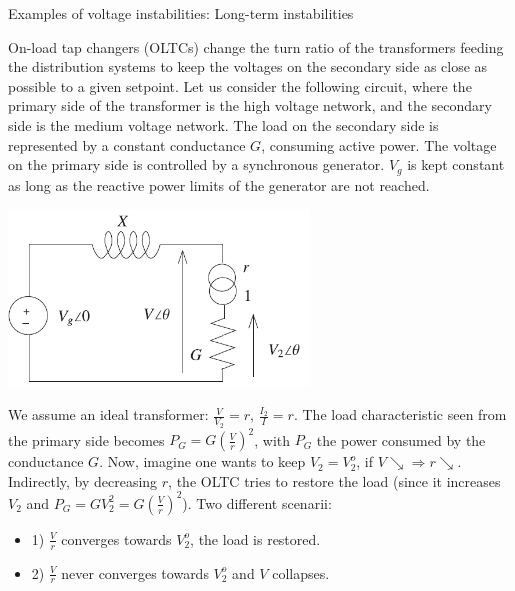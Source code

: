 \begin{frame}[allowframebreaks]{Examples of voltage instabilities: Long-term instabilities}

On-load tap changers (OLTCs) change the turn ratio of the transformers feeding the distribution systems to keep the voltages on the secondary side as close as possible to a given setpoint.
Let us consider the following circuit, where the primary side of the transformer is the high voltage network, and the secondary side is the medium voltage network.
The load on the secondary side is represented by a constant conductance $G$, consuming active power.
The voltage on the primary side is controlled by a synchronous generator. $V_g$ is kept constant as long as the reactive power limits of the generator are not reached.
\begin{center}
\includegraphics[width=0.6\textwidth]{images/OLTC.png}
\end{center}

We assume an ideal transformer: $\frac{V}{V_2} = r$, $\frac{I_2}{I} = r$.
The load characteristic seen from the primary side becomes $P_G = G\left(\frac{V}{r}\right)^2$, with $P_G$ the power consumed by the conductance $G$.
Now, imagine one wants to keep $V_2 = V_2^o$, if $V \searrow \Rightarrow r \searrow$. Indirectly, by decreasing $r$, the OLTC tries to restore the load (since it increases $V_2$ and $P_G = G V_2^2 = G\left(\frac{V}{r}\right)^2$).
Two different scenarii:
\begin{itemize}
    \item 1) $\frac{V}{r}$ converges towards $V_2^o$, the load is restored.
    \item 2) $\frac{V}{r}$ never converges towards $V_2^o$ and $V$ collapses.
\end{itemize}



\end{frame}
